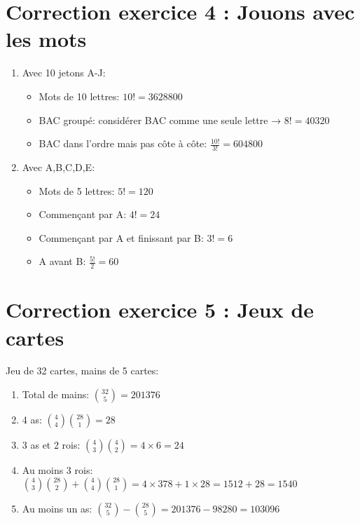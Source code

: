 \section*{Correction exercice 4 : Jouons avec les mots}

\begin{enumerate}
    \item Avec 10 jetons A-J:
    \begin{itemize}
        \item Mots de 10 lettres: \(10! = 3628800\)
        \item BAC groupé: considérer BAC comme une seule lettre → \(8! = 40320\)
        \item BAC dans l'ordre mais pas côte à côte: \(\frac{10!}{3!} = 604800\)
    \end{itemize}
    
    \item Avec A,B,C,D,E:
    \begin{itemize}
        \item Mots de 5 lettres: \(5! = 120\)
        \item Commençant par A: \(4! = 24\)
        \item Commençant par A et finissant par B: \(3! = 6\)
        \item A avant B: \(\frac{5!}{2} = 60\)
    \end{itemize}
\end{enumerate}

\section*{Correction exercice 5 : Jeux de cartes}

Jeu de 32 cartes, mains de 5 cartes:

\begin{enumerate}
    \item Total de mains: \(\binom{32}{5} = 201376\)
    \item 4 as: \(\binom{4}{4}\binom{28}{1} = 28\)
    \item 3 as et 2 rois: \(\binom{4}{3}\binom{4}{2} = 4 \times 6 = 24\)
    \item Au moins 3 rois: \(\binom{4}{3}\binom{28}{2} + \binom{4}{4}\binom{28}{1} = 4 \times 378 + 1 \times 28 = 1512 + 28 = 1540\)
    \item Au moins un as: \(\binom{32}{5} - \binom{28}{5} = 201376 - 98280 = 103096\)
\end{enumerate}

